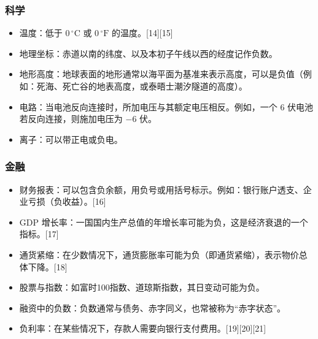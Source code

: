 \subsubsection{科学}
\begin{itemize}
\item 温度：低于 $0 \,^\circ\text{C}$ 或 $0 \,^\circ\text{F}$ 的温度。[14][15]
\item 地理坐标：赤道以南的纬度、以及本初子午线以西的经度记作负数。
\item 地形高度：地球表面的地形通常以海平面为基准来表示高度，可以是负值（例如：死海、死亡谷的地表高度，或泰晤士潮汐隧道的高度）。
\item 电路：当电池反向连接时，所加电压与其额定电压相反。例如，一个 6 伏电池若反向连接，则施加电压为 $-6$ 伏。
\item 离子：可以带正电或负电。
\end{itemize}
\subsubsection{金融}
\begin{itemize}
\item 财务报表：可以包含负余额，用负号或用括号标示。例如：银行账户透支、企业亏损（负收益）。[16]
\item GDP 增长率：一国国内生产总值的年增长率可能为负，这是经济衰退的一个指标。[17]
\item 通货紧缩：在少数情况下，通货膨胀率可能为负（即通货紧缩），表示物价总体下降。[18]
\item 股票与指数：如富时100指数、道琼斯指数，其日变动可能为负。
\item 融资中的负数：负数通常与债务、赤字同义，也常被称为“赤字状态”。
\item 负利率：在某些情况下，存款人需要向银行支付费用。[19][20][21]
\end{itemize}
